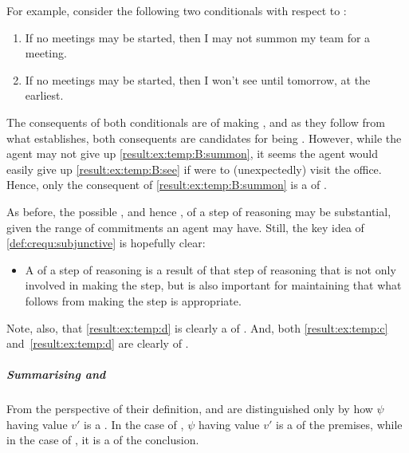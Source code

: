 \begin{note}
  For example, consider the following two conditionals with respect to \CStepC{}:
  \begin{enumerate}[label=C\(^{+}\)\arabic*., ref=(C\(^{+}\)\arabic*)]
  \item
    \label{result:ex:temp:B:summon}
    If no meetings may be started, then I may not summon my team for a meeting.
  \item
    \label{result:ex:temp:B:see}
    If no meetings may be started, then I won't see  until tomorrow, at the earliest.
  \end{enumerate}
  The consequents of both conditionals are  of making \CStepC{}, and as they follow from what \CStepC{} establishes, both consequents are candidates for being .
  However, while the agent may not give up \ref{result:ex:temp:B:summon}, it seems the agent would easily give up \ref{result:ex:temp:B:see} if  were to (unexpectedly) visit the office.
  Hence, only the consequent of \ref{result:ex:temp:B:summon} is a  of \CStepC{}.
\end{note}

\begin{note}
  As before, the possible , and hence , of a step of reasoning may be substantial, given the range of commitments an agent may have.
  Still, the key idea of \ref{def:crequ:subjunctive} is hopefully clear:
  \begin{itemize}
  \item
    A \crequ{} of a step of reasoning is a result of that step of reasoning that is not only involved in making the step, but is also important for maintaining that what follows from making the step is appropriate.
  \end{itemize}
\end{note}

\begin{note}
  Note, also, that \ref{result:ex:temp:d} is clearly a \crequ{} of \CStepC{}.
  And, both \ref{result:ex:temp:c} and~\ref{result:ex:temp:d} are clearly  of \CStepB{}.
\end{note}

\subparagraph*{Summarising  and }

\begin{note}
  From the perspective of their definition,  and  are distinguished only by how \(\psi\) having value \(v'\) is a .
  In the case of , \(\psi\) having value \(v'\) is a  of the premises, while in the case of , it is a  of the conclusion.
\end{note}

